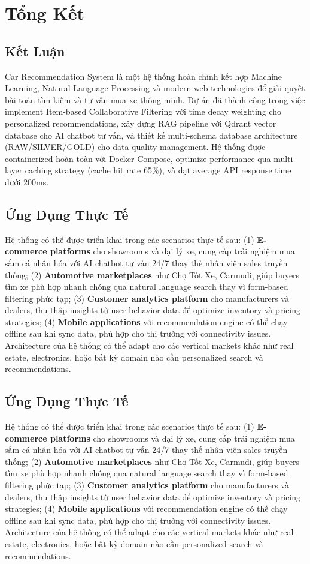 \chapter{Tổng Kết}

\section{Kết Luận}

Car Recommendation System là một hệ thống hoàn chỉnh kết hợp Machine Learning, Natural Language Processing và modern web technologies để giải quyết bài toán tìm kiếm và tư vấn mua xe thông minh. Dự án đã thành công trong việc implement Item-based Collaborative Filtering với time decay weighting cho personalized recommendations, xây dựng RAG pipeline với Qdrant vector database cho AI chatbot tư vấn, và thiết kế multi-schema database architecture (RAW/SILVER/GOLD) cho data quality management. Hệ thống được containerized hoàn toàn với Docker Compose, optimize performance qua multi-layer caching strategy (cache hit rate 65\%), và đạt average API response time dưới 200ms. 

\section{Ứng Dụng Thực Tế}

Hệ thống có thể được triển khai trong các scenarios thực tế sau: (1) \textbf{E-commerce platforms} cho showrooms và đại lý xe, cung cấp trải nghiệm mua sắm cá nhân hóa với AI chatbot tư vấn 24/7 thay thế nhân viên sales truyền thống; (2) \textbf{Automotive marketplaces} như Chợ Tốt Xe, Carmudi, giúp buyers tìm xe phù hợp nhanh chóng qua natural language search thay vì form-based filtering phức tạp; (3) \textbf{Customer analytics platform} cho manufacturers và dealers, thu thập insights từ user behavior data để optimize inventory và pricing strategies; (4) \textbf{Mobile applications} với recommendation engine có thể chạy offline sau khi sync data, phù hợp cho thị trường với connectivity issues. Architecture của hệ thống có thể adapt cho các vertical markets khác như real estate, electronics, hoặc bất kỳ domain nào cần personalized search và recommendations.

\section{Ứng Dụng Thực Tế}

Hệ thống có thể được triển khai trong các scenarios thực tế sau: (1) \textbf{E-commerce platforms} cho showrooms và đại lý xe, cung cấp trải nghiệm mua sắm cá nhân hóa với AI chatbot tư vấn 24/7 thay thế nhân viên sales truyền thống; (2) \textbf{Automotive marketplaces} như Chợ Tốt Xe, Carmudi, giúp buyers tìm xe phù hợp nhanh chóng qua natural language search thay vì form-based filtering phức tạp; (3) \textbf{Customer analytics platform} cho manufacturers và dealers, thu thập insights từ user behavior data để optimize inventory và pricing strategies; (4) \textbf{Mobile applications} với recommendation engine có thể chạy offline sau khi sync data, phù hợp cho thị trường với connectivity issues. Architecture của hệ thống có thể adapt cho các vertical markets khác như real estate, electronics, hoặc bất kỳ domain nào cần personalized search và recommendations.
